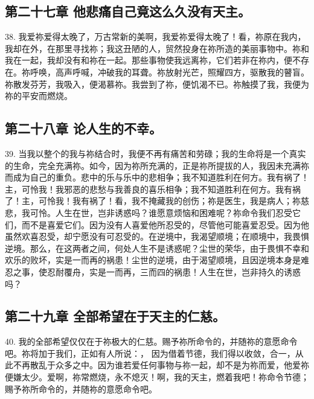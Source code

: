 
\subsection{第二十七章 他悲痛自己竟这么久没有天主。}

38. 我爱祢爱得太晚了，万古常新的美啊，我爱祢爱得太晚了！看，祢原在我内，我却在外，在那里寻找祢；我这丑陋的人，贸然投身在祢所造的美丽事物中。祢和我在一起，我却没有和祢在一起。那些事物使我远离祢，它们若非在祢内，便不存在。祢呼唤，高声呼喊，冲破我的耳聋。祢放射光芒，照耀四方，驱散我的瞽盲。祢散发芬芳，我吸入，便渴慕祢。我尝到了祢，便饥渴不已。祢触摸了我，我便为祢的平安而燃烧。\par


\subsection{第二十八章 论人生的不幸。}

39. 当我以整个的我与祢结合时，我便不再有痛苦和劳碌；我的生命将是一个真实的生命，完全充满祢。如今，因为祢所充满的，正是祢所提拔的人，我因未充满祢而成为自己的重负。悲中的乐与乐中的悲相争；我不知道胜利在何方。我有祸了！主，可怜我！我邪恶的悲愁与我善良的喜乐相争；我不知道胜利在何方。我有祸了！主，可怜我！我有祸了！看，我不掩藏我的创伤；祢是医生，我是病人；祢慈悲，我可怜。人生在世，岂非诱惑吗？谁愿意烦恼和困难呢？祢命令我们忍受它们，而不是喜爱它们。因为没有人喜爱他所忍受的，尽管他可能喜爱忍受。因为他虽然欢喜忍受，却宁愿没有可忍受的。在逆境中，我渴望顺境；在顺境中，我畏惧逆境。那么，在这两者之间，何处人生不是诱惑呢？尘世的荣华，由于畏惧不幸和欢乐的败坏，实是一而再的祸患！尘世的逆境，由于渴望顺境，且因逆境本身是难忍之事，使忍耐覆舟，实是一而再，三而四的祸患！人生在世，岂非持久的诱惑吗？\par


\subsection{第二十九章 全部希望在于天主的仁慈。}

40. 我的全部希望仅仅在于祢极大的仁慈。赐予祢所命令的，并随祢的意愿命令吧。祢将加于我们，正如有人所说：， 因为借着节德，我们得以收敛，合一，从此不再散乱于众多之中。因为谁若爱任何事物与祢一起，却不是为祢而爱，他爱祢便嫌太少。爱啊，祢常燃烧，永不熄灭！啊，我的天主，燃着我吧！祢命令节德；赐予祢所命令的，并随祢的意愿命令吧。\par

